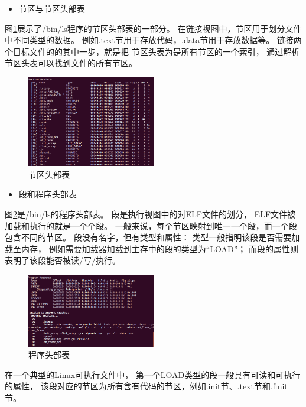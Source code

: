 \begin{itemize}
  \item 节区与节区头部表
\end{itemize}

图\ref{sections}展示了/bin/ls程序的节区头部表的一部分。
在链接视图中，节区用于划分文件中不同类型的数据。
例如.text节用于存放代码，.data节用于存放数据等。
链接两个目标文件的的其中一步，就是把
节区头表为是所有节区的一个索引，
通过解析节区头表可以找到文件的所有节区。

\begin{figure}[h!]
  \centering
  \includegraphics[width=0.5\textwidth]{figure/sections.png}
  \caption{节区头部表}
  \label{sections}
\end{figure}

\begin{itemize}
  \item 段和程序头部表
\end{itemize}

图\ref{programs}是/bin/ls的程序头部表。
段是执行视图中的对ELF文件的划分，
ELF文件被加载和执行的就是一个个段。
一般来说，每个节区映射到唯一一个段，而一个段包含不同的节区。
段没有名字，但有类型和属性：
类型一般指明该段是否需要加载至内存，
例如需要加载器加载到主存中的段的类型为“LOAD”；
而段的属性则表明了该段能否被读/写/执行。

\begin{figure}[h!]
  \centering
  \includegraphics[width=0.5\textwidth]{figure/programs.png}
  \caption{程序头部表}
  \label{programs}
\end{figure}
在一个典型的Linux可执行文件中，
第一个LOAD类型的段一般具有可读和可执行的属性，
该段对应的节区为所有含有代码的节区，例如.init节、.text节和.finit节。

